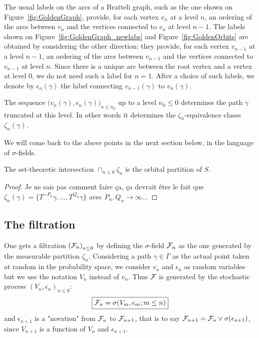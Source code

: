 \documentclass[12pt,a4paper]{article}
\begin{document}
The usual labels on the arcs of a Bratteli graph, such as the one 
shown on Figure~\ref{fig:GoldenGraph}, provide, for each vertex $v_n$ 
at a level $n$, an ordering of the arcs between $v_n$ and the vertices connected 
to $v_n$ at level $n-1$.  
The labels shown on Figure~\ref{fig:GoldenGraph_newlabs} and Figure~\ref{fig:GoldenOrbits} 
are obtained by considering the other direction: they provide, 
for each vertex $v_{n-1}$ at a level $n-1$, 
an ordering of the arcs between $v_{n-1}$ and the vertices connected 
to $v_{n-1}$ at level $n$. 
Since there is a unique arc between the root vertex and a vertex at level $0$, 
we do not need such a label for $n=1$. 
After a choice of such labels, we denote 
by $\epsilon_n(\gamma)$ the label connecting $v_{n-1}(\gamma)$ to 
$v_n(\gamma)$. 
 
The sequence $\bigl(v_n(\gamma), \epsilon_n(\gamma)\bigr)_{n \leq n_0}$ up to 
a level $n_0 \leq 0$ determines the path $\gamma$ truncated at this level. 
In other words it determines the $\zeta_{n}$-equivalence classe 
$\zeta_n(\gamma)$. 

We will come back to the above points in the next section below, in the 
language of $\sigma$-fields. 

\begin{lemma}
The set-theoretic intersection $\cap_{n \leq 0} \zeta_n$ is the orbital partition of $S$. 
\end{lemma}

\begin{proof}
Je ne sais pas comment faire ça, ça devrait être le fait que 
$\zeta_n(\gamma) = \{T^{-P_n}\gamma, \ldots, T^{Q_n}\gamma\}$ avec 
$P_n,Q_n\to\infty$... 
\end{proof}

\subsection{The filtration}

One gets a filtration ${(\mathcal{F}_n)}_{n \leq 0}$ by defining the $\sigma$-field 
$\mathcal{F}_n$ as the one generated by the measurable partition $\zeta_n$. 
Considering a path $\gamma \in \Gamma$ as the actual point taken at random 
in the probability space, we consider $v_n$ and $\epsilon_n$ as random 
variables but we use the notation $V_n$ instead of $v_n$. 
Thus $\mathcal{F}$ is generated by the stochastic process 
${(V_n, \epsilon_n)}_{n \leq 0}$:
$$
\boxed{\mathcal{F}_n = \sigma(V_m, \epsilon_m; m \leq n)}
$$
 and $\epsilon_{n+1}$ is a "novation" from $\mathcal{F}_n$ to $\mathcal{F}_{n+1}$, that is 
to say $\mathcal{F}_{n+1} = \mathcal{F}_n \vee \sigma(\epsilon_{n+1})$, since 
$V_{n+1}$ is a function of $V_n$ and $\epsilon_{n+1}$. 
\end{document}
